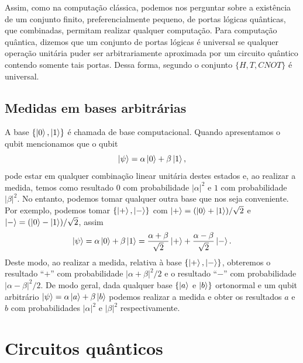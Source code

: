 Assim, como na computação clássica, podemos nos perguntar sobre a existência de um conjunto finito, preferencialmente pequeno, de portas lógicas quânticas, que combinadas, permitam realizar qualquer computação. Para computação quântica, dizemos que um conjunto de portas lógicas é universal se qualquer operação unitária puder ser arbitrariamente aproximada por um circuito quântico contendo somente tais portas. Dessa forma, segundo \cite[seção 4.5]{nielsen2010quantum} o conjunto $\{H, T, CNOT\}$ é universal.

\subsection{Medidas em bases arbitrárias}

A base $\{\ket{0}, \ket{1}\}$ é chamada de base computacional. Quando apresentamos o qubit mencionamos que o qubit
%
\begin{equation}
    \ket{\psi} = \alpha\ket{0} + \beta\ket{1},
\end{equation}
%
pode estar em qualquer combinação linear unitária destes estados e, ao realizar a medida, temos como resultado $0$ com probabilidade $|\alpha|^2$ e $1$ com probabilidade $|\beta|^2$. No entanto, podemos tomar qualquer outra base que nos seja conveniente. Por exemplo, podemos tomar $\{\ket{+}, \ket{-}\}$ com $\ket{+}=(\ket{0}+\ket{1})/\sqrt{2}$ e $\ket{-}=(\ket{0}-\ket{1})/\sqrt{2}$, assim
%
\begin{equation}
    \ket{\psi} = \alpha\ket{0} + \beta\ket{1} = \frac{\alpha+\beta}{\sqrt{2}}\ket{+} + \frac{\alpha - \beta}{\sqrt{2}}\ket{-}.
\end{equation}
%
Deste modo, ao realizar a medida, relativa à base $\{\ket{+}, \ket{-}\}$, obteremos o resultado ``$+$'' com probabilidade $|\alpha+\beta|^2/2$ e o resultado ``$-$'' com probabilidade $|\alpha-\beta|^2/2$. De modo geral, dada qualquer base $\{\ket{a}$ e $\ket{b}\}$ ortonormal e um qubit arbitrário $\ket{\psi} = \alpha \ket{a} + \beta\ket{b}$ podemos realizar a medida e obter os resultados $a$ e $b$ com probabilidades $|\alpha|^2$ e $|\beta|^2$ respectivamente.

\section{Circuitos quânticos}\label{sec:cq}

